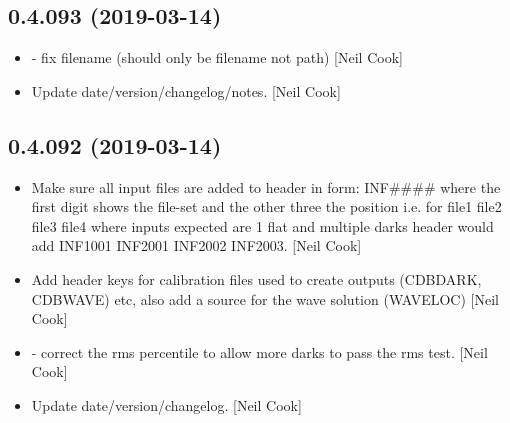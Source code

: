 \documentclass[a4paper,10pt,english]{report}
\begin{document}
\subsection{0.4.093 (2019-03-14)}
\label{\detokenize{misc/changelog:id167}}\begin{itemize}
\item {} 
 - fix filename (should only be filename not
path) {[}Neil Cook{]}

\item {} 
Update date/version/changelog/notes. {[}Neil Cook{]}

\end{itemize}


\subsection{0.4.092 (2019-03-14)}
\label{\detokenize{misc/changelog:id168}}\begin{itemize}
\item {} 
Make sure all input files are added to header in form: INF\#\#\#\# where
the first digit shows the file-set and the other three the position
i.e. for   file1 file2 file3 file4   where inputs
expected are 1 flat and multiple darks header would add INF1001
INF2001 INF2002 INF2003. {[}Neil Cook{]}

\item {} 
Add header keys for calibration files used to create outputs (CDBDARK,
CDBWAVE) etc, also add a source for the wave solution (WAVELOC) {[}Neil
Cook{]}

\item {} 
 - correct the rms percentile to allow more darks to
pass the rms test. {[}Neil Cook{]}

\item {} 
Update date/version/changelog. {[}Neil Cook{]}

\end{itemize}
\end{document}
